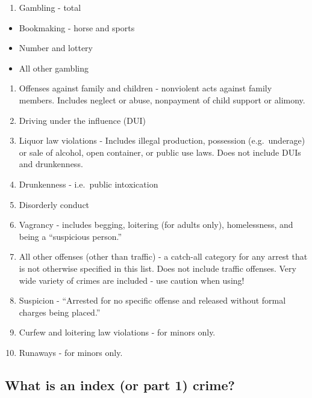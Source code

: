 \documentclass[
  12pt,
  openany]{book}
\providecommand{\tightlist}{%
  \setlength{\itemsep}{0pt}\setlength{\parskip}{0pt}}
\begin{document}
\begin{enumerate}
\def\labelenumi{\arabic{enumi}.}
\setcounter{enumi}{18}
\tightlist
\item
  Gambling - total
\end{enumerate}

\begin{itemize}
\tightlist
\item
  Bookmaking - horse and sports
\item
  Number and lottery
\item
  All other gambling
\end{itemize}

\begin{enumerate}
\def\labelenumi{\arabic{enumi}.}
\setcounter{enumi}{19}
\tightlist
\item
  Offenses against family and children - nonviolent acts against family members. Includes neglect or abuse, nonpayment of child support or alimony.
\item
  Driving under the influence (DUI)
\item
  Liquor law violations - Includes illegal production, possession (e.g.~underage) or sale of alcohol, open container, or public use laws. Does not include DUIs and drunkenness.
\item
  Drunkenness - i.e.~public intoxication
\item
  Disorderly conduct
\item
  Vagrancy - includes begging, loitering (for adults only), homelessness, and being a ``suspicious person.''
\item
  All other offenses (other than traffic) - a catch-all category for any arrest that is not otherwise specified in this list. Does not include traffic offenses. Very wide variety of crimes are included - use caution when using!
\item
  Suspicion - ``Arrested for no specific offense and released without formal charges being placed.''
\item
  Curfew and loitering law violations - for minors only.
\item
  Runaways - for minors only.
\end{enumerate}

\hypertarget{index_crimes}{%
\subsection{What is an index (or part 1) crime?}\label{index_crimes}}
\end{document}
